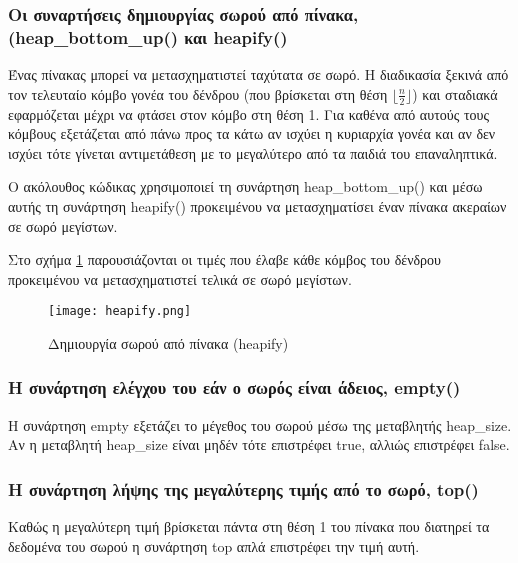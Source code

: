 

\subsubsection*{Οι συναρτήσεις δημιουργίας σωρού από πίνακα, (heap\_bottom\_up() και heapify()}
Ένας πίνακας μπορεί να μετασχηματιστεί ταχύτατα σε σωρό. Η διαδικασία ξεκινά από τον τελευταίο κόμβο γονέα του δένδρου (που βρίσκεται στη θέση $\lfloor{\frac{n}{2}}\rfloor$) και σταδιακά εφαρμόζεται μέχρι να φτάσει στον κόμβο στη θέση 1. Για καθένα από αυτούς τους κόμβους εξετάζεται από πάνω προς τα κάτω αν ισχύει η κυριαρχία γονέα και αν δεν ισχύει τότε γίνεται αντιμετάθεση με το μεγαλύτερο από τα παιδιά του επαναληπτικά. 

Ο ακόλουθος κώδικας χρησιμοποιεί τη συνάρτηση heap\_bottom\_up() και μέσω αυτής τη συνάρτηση heapify() προκειμένου να μετασχηματίσει έναν πίνακα ακεραίων σε σωρό μεγίστων. 




Στο σχήμα \ref{fig:heapify} παρουσιάζονται οι τιμές που έλαβε κάθε κόμβος του δένδρου προκειμένου να μετασχηματιστεί τελικά σε σωρό μεγίστων.

\begin{figure}[ht]
\centering
\texttt{[image: heapify.png]}
\caption{Δημιουργία σωρού από πίνακα (heapify)}
\label{fig:heapify}
\end{figure}

\subsubsection*{Η συνάρτηση ελέγχου του εάν ο σωρός είναι άδειος, empty()}
Η συνάρτηση empty εξετάζει το μέγεθος του σωρού μέσω της μεταβλητής heap\_size. Αν η μεταβλητή heap\_size είναι μηδέν τότε επιστρέφει true, αλλιώς επιστρέφει false.

\subsubsection*{Η συνάρτηση λήψης της μεγαλύτερης τιμής από το σωρό, top()}
Καθώς η μεγαλύτερη τιμή βρίσκεται πάντα στη θέση 1 του πίνακα που διατηρεί τα δεδομένα του σωρού η συνάρτηση top απλά επιστρέφει την τιμή αυτή.

